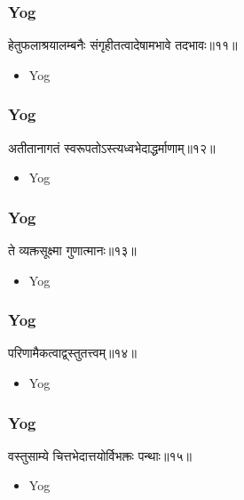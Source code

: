 \begin{frame}[fragile]\frametitle{Yog}
\begin{sanskrit}
हेतुफलाश्रयालम्बनैः संगृहीतत्वादेषामभावे तदभावः॥११॥
\end{sanskrit}
	\begin{itemize}
	\item Yog 
	\end{itemize}
\end{frame}


\begin{frame}[fragile]\frametitle{Yog}
\begin{sanskrit}
अतीतानागतं स्वरूपतोऽस्त्यध्वभेदाद्धर्माणाम्॥१२॥
\end{sanskrit}
	\begin{itemize}
	\item Yog 
	\end{itemize}
\end{frame}


\begin{frame}[fragile]\frametitle{Yog}
\begin{sanskrit}
ते व्यक्तसूक्ष्मा गुणात्मानः॥१३॥
\end{sanskrit}
	\begin{itemize}
	\item Yog 
	\end{itemize}
\end{frame}



\begin{frame}[fragile]\frametitle{Yog}
\begin{sanskrit}
परिणामैकत्वाद्व्स्तुतत्त्वम्॥१४॥ 
\end{sanskrit}
	\begin{itemize}
	\item Yog 
	\end{itemize}
\end{frame}

\begin{frame}[fragile]\frametitle{Yog}
\begin{sanskrit}
वस्तुसाम्ये चित्तभेदात्तयोर्विभक्तः पन्थाः॥१५॥
\end{sanskrit}
	\begin{itemize}
	\item Yog 
	\end{itemize}
\end{frame}



